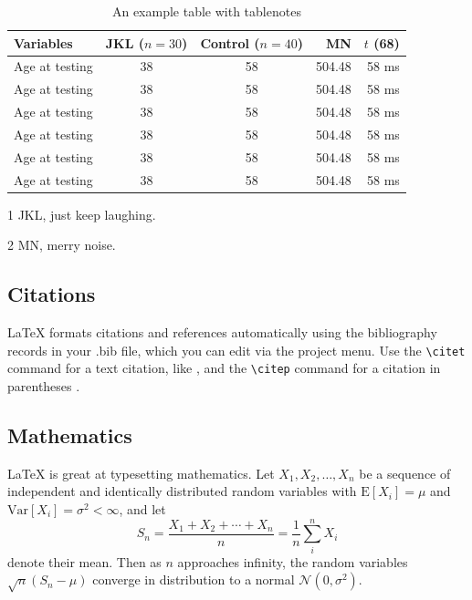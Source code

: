 \begin{table}[hbt!]\centering
\begin{threeparttable}
\caption{An example table with tablenotes}\label{tab:withnotes}

\begin{tabular}{lccrr}
\toprule
Variables & JKL ($n=30$) & Control ($n=40$) & MN & $t$ (68)\\
\midrule
Age at testing & 38 & 58\tnote{1} & 504.48 & 58 ms\\
Age at testing & 38 & 58 & 504.48 & 58 ms\\
Age at testing & 38 & 58 & 504.48 & 58 ms\\
Age at testing & 38 & 58 & 504.48 & 58 ms\\
Age at testing\tnote{2} & 38 & 58 & 504.48 & 58 ms\\
Age at testing & 38 & 58 & 504.48 & 58 ms\\
\bottomrule
\end{tabular}
\begin{tablenotes}
\item[1] JKL, just keep laughing.
\item[2] MN, merry noise.
\end{tablenotes}
\end{threeparttable}
\end{table}

\subsection{Citations}

LaTeX formats citations and references automatically using the bibliography records in your .bib file, which you can edit via the project menu. Use the \verb|\citet| command for a text citation, like \citet{lees2010theoretical}, and the \verb|\citep| command for a citation in parentheses \citep{McQuilton01012012}.

\subsection{Mathematics}

\LaTeX{} is great at typesetting mathematics. Let $X_1, X_2, \ldots, X_n$ be a sequence of independent and identically distributed random variables with $\text{E}[X_i] = \mu$ and $\text{Var}[X_i] = \sigma^2 < \infty$, and let
\begin{equation}\label{eq:sum}
S_n = \frac{X_1 + X_2 + \cdots + X_n}{n}
      = \frac{1}{n}\sum_{i}^{n} X_i
\end{equation}
denote their mean. Then as $n$ approaches infinity, the random variables $\sqrt{n}(S_n - \mu)$ converge in distribution to a normal $\mathcal{N}(0, \sigma^2)$.

